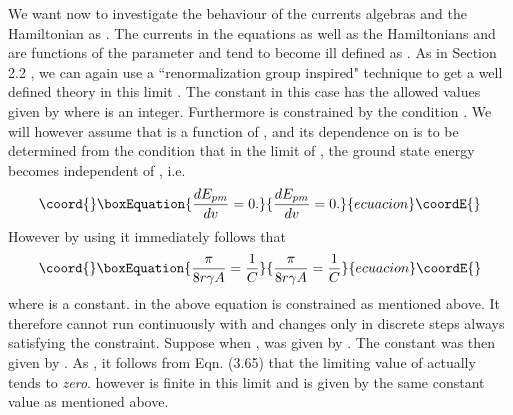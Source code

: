 \documentclass[a4paper,12pt]{article}
\begin{document}
We want now to investigate the behaviour of the 
currents algebras and the Hamiltonian as \coordHE{}.
The currents in the equations \coordHE{}  \coordHE{} as well as the
 Hamiltonians \coordHE{} and \coordHE{} are functions of the parameter
\coordHE{} and tend to become ill defined as \coordHE{} . As in Section 
2.2 , we can again use a
``renormalization group inspired" technique to get
 a well defined theory in this limit . The  constant \coordHE{} in this case 
has the allowed values given by \coordHE{} where \coordHE{} is an
integer. Furthermore \coordHE{} is constrained by the condition
\coordHE{} . We will however 
 assume that \coordHE{} is a function of \coordHE{},
and its dependence on \coordHE{} is to be determined from the condition that
in the limit of \coordHE{}, the ground state energy \coordHE{} becomes
independent of \coordHE{}, i.e.
\begin{equation}\coord{}\boxEquation{
\frac{dE_{pm}}{dv} = 0.
}{
\frac{dE_{pm}}{dv} = 0.
}{ecuacion}\coordE{}\end{equation}
However by using \coordHE{} it immediately follows that 
\begin{equation}\coord{}\boxEquation{
\frac{{\pi}}{8r{\gamma}A}= \frac{1}{C}
}{
\frac{{\pi}}{8r{\gamma}A}= \frac{1}{C}
}{ecuacion}\coordE{}\end{equation}
where \coordHE{} is a constant. 
\coordHE{} in the above equation is constrained as mentioned above.
It therefore cannot run continuously with \coordHE{} and changes only in discrete
steps always satisfying the constraint. Suppose when \coordHE{}, \coordHE{} was given by
 \coordHE{}. The constant \coordHE{} was then given by 
\coordHE{}. As  \coordHE{}, it follows from Eqn. (3.65)
that the limiting value of \coordHE{} actually tends to {\it zero}. \coordHE{} however is
finite in this limit and is 
given by the same constant value as mentioned above.
\end{document}
